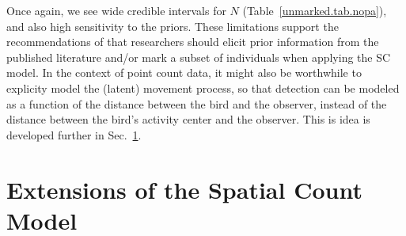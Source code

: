
Once again, we see wide credible intervals for $N$
(Table~\ref{unmarked.tab.nopa}), and also high sensitivity to the
priors. These limitations support the recommendations of
\citet{chandler_royle:2012} that researchers should elicit prior
information from the published literature and/or mark a subset of
individuals when applying the SC model. In the context of point count
data, it might also be worthwhile to explicity model the (latent) movement
process, so that detection can be modeled as a function of the
distance between the bird and the observer, instead of the distance
between the bird's activity center and the observer. This is idea is
developed further in Sec.~\ref{unmarked.sec.ext}.






\section{Extensions of the Spatial Count Model}
\label{unmarked.sec.ext}

